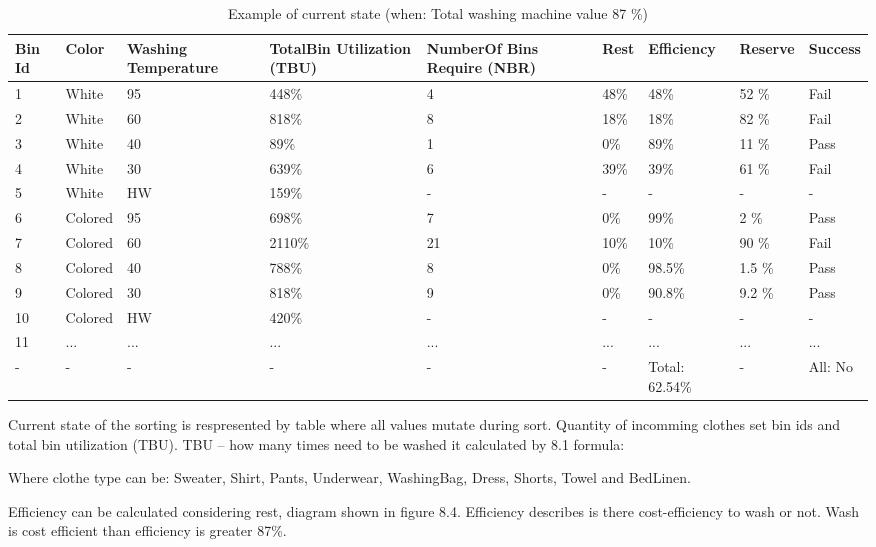 \begin{table}[h]
	
    \begin{tabular}{ | p{0.4cm} | p{1cm} | p{2cm} | p{1.7cm} |p{2cm} |p{1cm} |p{1.3cm} |p{1.2cm} |p{1.3cm} |}
    \hline
	Bin Id & Color & Washing Temperature & TotalBin Utilization (TBU) & NumberOf Bins Require (NBR) & Rest & Efficiency & Reserve & Success\\ \hline
	1 & White & 95 & 448\% & 4 & 48\% & 48\% & 52 \% & Fail \\ \hline
	2 & White & 60 & 818\% & 8 & 18\% & 18\% & 82 \% & Fail \\ \hline
	3 & White & 40 & 89\% & 1 & 0\% & 89\% & 11 \% & Pass \\ \hline
	4 & White & 30 & 639\% & 6 & 39\% & 39\% & 61 \% & Fail \\ \hline
	5 & White & HW & 159\% & - & - & - & - & - \\ \hline
	6 & Colored & 95 & 698\% & 7 & 0\% & 99\% & 2 \% & Pass \\ \hline
	7 & Colored & 60 & 2110\% & 21 & 10\% & 10\% & 90 \% & Fail \\ \hline
	8 & Colored & 40 & 788\% & 8 & 0\% & 98.5\% & 1.5 \% & Pass \\ \hline
	9 & Colored & 30 & 818\% & 9 & 0\% & 90.8\% & 9.2 \% & Pass \\ \hline
	10 & Colored & HW & 420\% & - & - & - & - & - \\ \hline
	11 & ... & ... & ... & ... & ... & ... & ... & ... \\ \hline
	- & - & - & - & - & - & Total: 62.54\% & - & All: No \\ \hline
    \end{tabular}
	\caption{Example of current state (when: Total washing machine value 87 \%)}
	\label{tab:AdDis}
\end{table}

\newpage
Current state of the sorting is respresented by table where all values mutate during sort. Quantity of incomming clothes set bin ids and total bin utilization (TBU). TBU – how many times need to be washed it calculated by 8.1 formula:

Where clothe type can be: Sweater, Shirt, Pants, Underwear, WashingBag, Dress, Shorts, Towel and BedLinen. 



Efficiency can be calculated considering rest, diagram shown in figure 8.4. Efficiency describes is there cost-efficiency to wash or not. Wash is cost efficient than efficiency is greater 87\%.


